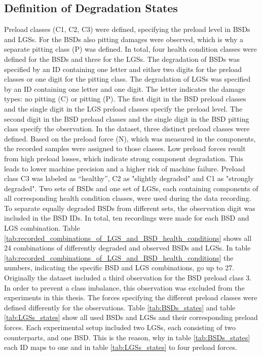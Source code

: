 \subsection{Definition of Degradation States}
Preload classes (C1, C2, C3) were defined, specifying the preload level in BSDs and LGSs. For the BSDs also pitting damages were observed, which is why a separate pitting class (P) was defined. In total, four health condition classes were defined for the BSDs and three for the LGSs. The degradation of BSDs was specified by an ID containing one letter and either two digits for the preload classes or one digit for the pitting class. The degradation of LGSs was specified by an ID containing one letter and one digit. The letter indicates the damage types: no pitting (C) or pitting (P). The first digit in the BSD preload classes and the single digit in the LGS preload classes specify the preload level. The second digit in the BSD preload classes and the single digit in the BSD pitting class specify the observation. In the dataset, three distinct preload classes were defined. Based on the preload force (N), which was measured in the components, the recorded samples were assigned to those classes. Low preload forces result from high preload losses, which indicate strong component degradation. This leads to lower machine precision and a higher risk of machine failure. Preload class C3 was labeled as “healthy”, C2 as "slightly degraded" and C1 as "strongly degraded". Two sets of BSDs and one set of LGSs, each containing components of all corresponding health condition classes, were used during the data recording. To separate equally degraded BSDs from different sets, the observation digit was included in the BSD IDs. In total, ten recordings were made for each BSD and LGS combination. Table \ref{tab:recorded_combinations_of_LGS_and_BSD_health_conditions} shows all 24 combinations of differently degraded and observed BSDs and LGSs. In table \ref{tab:recorded_combinations_of_LGS_and_BSD_health_conditions} the numbers, indicating the specific BSD and LGS combinations, go up to 27. Originally the dataset included a third observation for the BSD preload class 3. In order to prevent a class imbalance, this observation was excluded from the experiments in this thesis. The forces specifying the different preload classes were defined differently for the observations. Table \ref {tab:BSDs_states} and table \ref {tab:LGSs_states} show all used BSDs and LGSs and their corresponding preload forces. Each experimental setup included two LGSs, each consisting of two counterparts, and one BSD. This is the reason, why in table \ref {tab:BSDs_states} each ID maps to one and in table \ref {tab:LGSs_states} to four preload forces.

